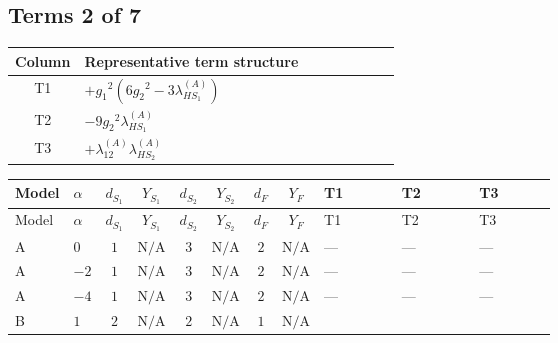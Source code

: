 \documentclass[8pt]{article}
\begin{document}
\begin{landscape}
\subsection*{Terms 2 of 7}
\begin{center}
\begin{tabular}{@{}c >{\raggedright\arraybackslash}p{0.82\linewidth}@{}}
\toprule
Column & Representative term structure \\
\midrule
T1 & \(\displaystyle +{g_1}^2 \left(6 {g_2}^2-3 {\lambda_{HS_1}^{(A)}}\right)\) \\
\midrule
T2 & \(\displaystyle -9 {g_2}^2 {\lambda_{HS_1}^{(A)}}\) \\
\midrule
T3 & \(\displaystyle +{\lambda_{12}^{(A)}} {\lambda_{HS_2}^{(A)}}\) \\
\midrule
\bottomrule
\end{tabular}
\end{center}
\smallskip
\tiny
\begin{longtable}{@{}llcccccc >{\raggedright\arraybackslash}p{0.21\linewidth} >{\raggedright\arraybackslash}p{0.21\linewidth} >{\raggedright\arraybackslash}p{0.21\linewidth}@{}}
\toprule
Model & $\alpha$ & $d_{S_1}$ & $Y_{S_1}$ & $d_{S_2}$ & $Y_{S_2}$ & $d_F$ & $Y_F$ & T1 & T2 & T3 \\
\midrule
\endfirsthead
\toprule
Model & $\alpha$ & $d_{S_1}$ & $Y_{S_1}$ & $d_{S_2}$ & $Y_{S_2}$ & $d_F$ & $Y_F$ & T1 & T2 & T3 \\
\midrule
\endhead
A & $0$ & $1$ & $\text{N/A}$ & $3$ & $\text{N/A}$ & $2$ & $\text{N/A}$ & --- & --- & --- \\
\midrule
A & $-2$ & $1$ & $\text{N/A}$ & $3$ & $\text{N/A}$ & $2$ & $\text{N/A}$ & --- & --- & --- \\
\midrule
A & $-4$ & $1$ & $\text{N/A}$ & $3$ & $\text{N/A}$ & $2$ & $\text{N/A}$ & --- & --- & --- \\
\midrule
B & $1$ & $2$ & $\text{N/A}$ & $2$ & $\text{N/A}$ & $1$ & $\text{N/A}$ & \scriptsize\adjustbox{max width=\linewidth}{$\begin{gathered} +{g_1}^2 \left(6 {g_2}^2-3 {\lambda_{HS_1}^{(A)}}\right)\end{gathered}$} & \scriptsize\adjustbox{max width=\linewidth}{$\begin{gathered} -9 {g_2}^2 {\lambda_{HS_1}^{(A)}}\end{gathered}$} & \scriptsize\adjustbox{max width=\linewidth}{$\begin{gathered} +{\lambda_{12}^{(A)}} {\lambda_{HS_2}^{(A)}}\end{gathered}$} \\

\end{longtable}
\end{landscape}
\end{document}

